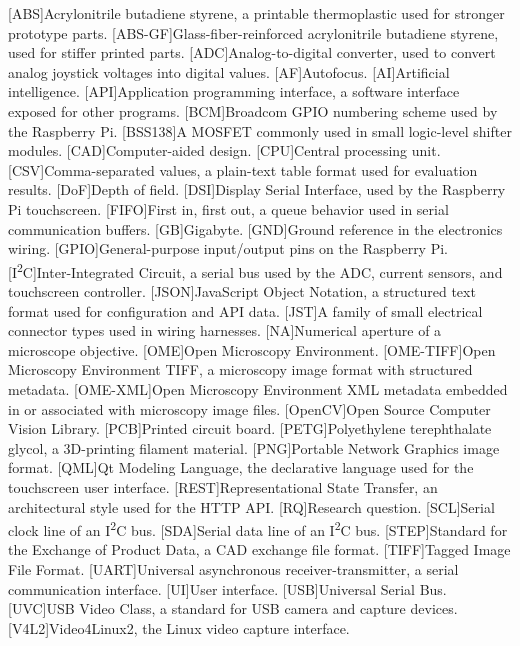 \begin{acronym}
    [ABS]{Acrylonitrile butadiene styrene, a printable thermoplastic used for stronger prototype parts.}
    [ABS-GF]{Glass-fiber-reinforced acrylonitrile butadiene styrene, used for stiffer printed parts.}
    [ADC]{Analog-to-digital converter, used to convert analog joystick voltages into digital values.}
    [AF]{Autofocus.}
    [AI]{Artificial intelligence.}
    [API]{Application programming interface, a software interface exposed for other programs.}
    [BCM]{Broadcom GPIO numbering scheme used by the Raspberry Pi.}
    [BSS138]{A MOSFET commonly used in small logic-level shifter modules.}
    [CAD]{Computer-aided design.}
    [CPU]{Central processing unit.}
    [CSV]{Comma-separated values, a plain-text table format used for evaluation results.}
    [DoF]{Depth of field.}
    [DSI]{Display Serial Interface, used by the Raspberry Pi touchscreen.}
    [FIFO]{First in, first out, a queue behavior used in serial communication buffers.}
    [GB]{Gigabyte.}
    [GND]{Ground reference in the electronics wiring.}
    [GPIO]{General-purpose input/output pins on the Raspberry Pi.}
    [I\textsuperscript{2}C]{Inter-Integrated Circuit, a serial bus used by the ADC, current sensors, and touchscreen controller.}
    [JSON]{JavaScript Object Notation, a structured text format used for configuration and API data.}
    [JST]{A family of small electrical connector types used in wiring harnesses.}
    [NA]{Numerical aperture of a microscope objective.}
    [OME]{Open Microscopy Environment.}
    [OME-TIFF]{Open Microscopy Environment TIFF, a microscopy image format with structured metadata.}
    [OME-XML]{Open Microscopy Environment XML metadata embedded in or associated with microscopy image files.}
    [OpenCV]{Open Source Computer Vision Library.}
    [PCB]{Printed circuit board.}
    [PETG]{Polyethylene terephthalate glycol, a 3D-printing filament material.}
    [PNG]{Portable Network Graphics image format.}
    [QML]{Qt Modeling Language, the declarative language used for the touchscreen user interface.}
    [REST]{Representational State Transfer, an architectural style used for the HTTP API.}
    [RQ]{Research question.}
    [SCL]{Serial clock line of an I\textsuperscript{2}C bus.}
    [SDA]{Serial data line of an I\textsuperscript{2}C bus.}
    [STEP]{Standard for the Exchange of Product Data, a CAD exchange file format.}
    [TIFF]{Tagged Image File Format.}
    [UART]{Universal asynchronous receiver-transmitter, a serial communication interface.}
    [UI]{User interface.}
    [USB]{Universal Serial Bus.}
    [UVC]{USB Video Class, a standard for USB camera and capture devices.}
    [V4L2]{Video4Linux2, the Linux video capture interface.}
\end{acronym}

